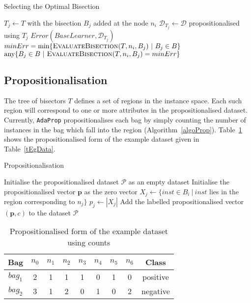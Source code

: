 \documentclass[a4paper,12pt]{article} %
\newcommand{\AdaProp}{\texttt{AdaProp}\xspace}
\newcommand{\mcl}[1]{\mathcal{#1}}
\newcommand{\vect}[1]{\boldsymbol{#1}}
\begin{document}
\begin{algorithm}
\caption{Selecting the Optimal Bisection}
\label{algoOptBisector} 
\begin{algorithmic}
    \State $T_j \gets T$ with the bisection $B_j$ added at the node $n_i$
        \State $\mcl{D}_{T_j} \gets \mcl{D}$ propositionalised using $T_j$
        \State \Return $Error(BaseLearner,\mcl{D}_{T_j})$
    \EndFunction
    \State 
    \State $minErr = \min \{ \textrm{\sc EvaluateBisection}(T,n_i,B_j) ~|~ B_j \in B \}$
    \State \Return $\textrm{any} \{ B_j \in B ~|~ \textrm{\sc EvaluateBisection}(T,n_i,B_j) = minErr \}$
    \EndFunction
\end{algorithmic}
\end{algorithm}

\subsection{Propositionalisation}
\label{secProp}

The tree of bisectors $T$ defines a set of regions in the instance space.
Each such region will correspond to one or more attributes 
    in the propositionalised dataset.
Currently, \AdaProp propositionalises each bag 
    by simply counting the number of instances in the bag which fall into the region
    (Algorithm~\ref{algoProp}).
Table~\ref{tEgPropCount} shows the propositionalised form of 
    the example dataset given in Table~\ref{tEgData}.

\begin{algorithm}
\caption{Propositionalisation}
\label{algoProp} 
    \begin{algorithmic}
    \State Initialise the propositionalised dataset $\mcl{P}$ as an empty dataset
    \ForAll{bags $(B_i,c) \in \mcl{D}$}
        \State Initialise the propositionalised vector $\vect{p}$ as the zero vector
            \State $X_j \gets \{ inst \in B_i ~|~ inst$ 
                lies in the region corresponding to $n_j \} $
            \State $p_{j} \gets | X_j |$
        \EndFor
        \State Add the labelled propositionalised vector $(\vect{p},c)$ 
            to the dataset $\mcl{P}$
    \EndFor
    \end{algorithmic}
\end{algorithm}
    
    
\begin{table}
\begin{center}
\begin{tabular}{*{9}{c}}
    \toprule
    Bag & $n_0$ & $n_1$ & $n_2$ & $n_3$ & $n_4$ & $n_5$ & $n_6$ & Class \\
    \midrule
    $bag_1$ & 2 &     1 & 1 &     1 & 0 & 1 & 0 & positive\\
    $bag_2$ & 3 &     1 & 2 &     0 & 1 & 0 & 2 & negative\\
    \bottomrule
    
\end{tabular}
\end{center}
\caption{Propositionalised form of the example dataset using counts}
\label{tEgPropCount}
\end{table}    
\end{document}
